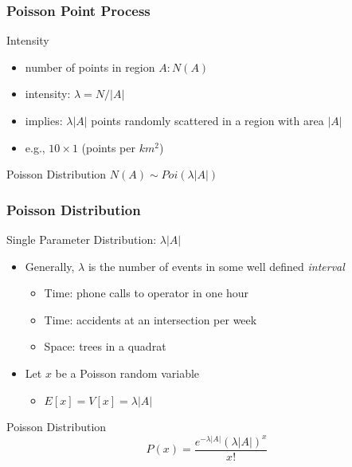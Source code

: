 \documentclass[nototal,handout]{beamer}
\begin{document}
 \begin{frame}
   \frametitle{Poisson Point Process}
   \begin{block}{Intensity}
     \begin{itemize}
       \item number of points in region $A: N(A)$
       \item intensity: $\lambda = N/|A|$
       \item implies: $\lambda |A|$ points randomly scattered in a region with
	 area $|A|$
       \item e.g., $10\times 1$ (points per $km^2$)
     \end{itemize}
    \end{block}
    \begin{block}{Poisson Distribution}
      $N(A) \sim Poi(\lambda |A|)$
    \end{block}
  \end{frame}


  \begin{frame}
    \frametitle{Poisson Distribution}
    \begin{block}{Single Parameter Distribution: $\lambda |A|$}
      \begin{itemize}
	\item Generally, $\lambda$ is the number of events in some well
	  defined \emph{interval}
	  \begin{itemize}
	    \item Time: phone calls to operator in one hour
	    \item Time: accidents at an intersection per week
	     \item Space: trees in a quadrat
	  \end{itemize}
	\item Let $x$ be a Poisson random variable
	  \begin{itemize}
	    \item $E[x] = V[x]= \lambda |A|$
	  \end{itemize}
      \end{itemize}
     \end{block}
     \begin{block}{Poisson Distribution}
       \begin{equation}
	 P(x) =  \frac{e^{-\lambda |A|} (\lambda |A|)^x}{x!}
       \end{equation}
     \end{block}
   \end{frame}
\end{document}
